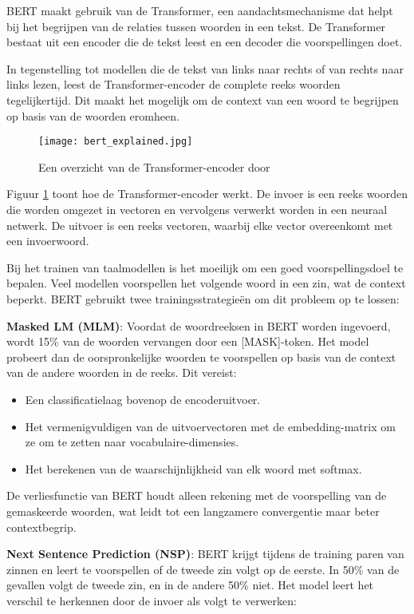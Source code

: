 BERT maakt gebruik van de Transformer, een aandachtsmechanisme dat helpt bij het begrijpen van de relaties tussen woorden in een tekst. De Transformer bestaat uit een encoder die de tekst leest en een decoder die voorspellingen doet.

In tegenstelling tot modellen die de tekst van links naar rechts of van rechts naar links lezen, leest de Transformer-encoder de complete reeks woorden tegelijkertijd. Dit maakt het mogelijk om de context van een woord te begrijpen op basis van de woorden eromheen.

\begin{figure}[ht]
    \centering
    \texttt{[image: bert\_explained.jpg]}
    \caption{Een overzicht van de Transformer-encoder door \autocite{Devlin2019}}
    \label{fig:bert_explained}
\end{figure}

Figuur \ref{fig:bert_explained} toont hoe de Transformer-encoder werkt. De invoer is een reeks woorden die worden omgezet in vectoren en vervolgens verwerkt worden in een neuraal netwerk. De uitvoer is een reeks vectoren, waarbij elke vector overeenkomt met een invoerwoord.

Bij het trainen van taalmodellen is het moeilijk om een goed voorspellingsdoel te bepalen. Veel modellen voorspellen het volgende woord in een zin, wat de context beperkt. BERT gebruikt twee trainingsstrategieën om dit probleem op te lossen:

\textbf{Masked LM (MLM)}: Voordat de woordreeksen in BERT worden ingevoerd, wordt 15\% van de woorden vervangen door een [MASK]-token. Het model probeert dan de oorspronkelijke woorden te voorspellen op basis van de context van de andere woorden in de reeks. Dit vereist:

\begin{itemize}
    \item Een classificatielaag bovenop de encoderuitvoer.
    \item Het vermenigvuldigen van de uitvoervectoren met de embedding-matrix om ze om te zetten naar vocabulaire-dimensies.
    \item Het berekenen van de waarschijnlijkheid van elk woord met softmax.
\end{itemize}

De verliesfunctie van BERT houdt alleen rekening met de voorspelling van de gemaskeerde woorden, wat leidt tot een langzamere convergentie maar beter contextbegrip.

\textbf{Next Sentence Prediction (NSP)}: BERT krijgt tijdens de training paren van zinnen en leert te voorspellen of de tweede zin volgt op de eerste. In 50\% van de gevallen volgt de tweede zin, en in de andere 50\% niet. Het model leert het verschil te herkennen door de invoer als volgt te verwerken:

